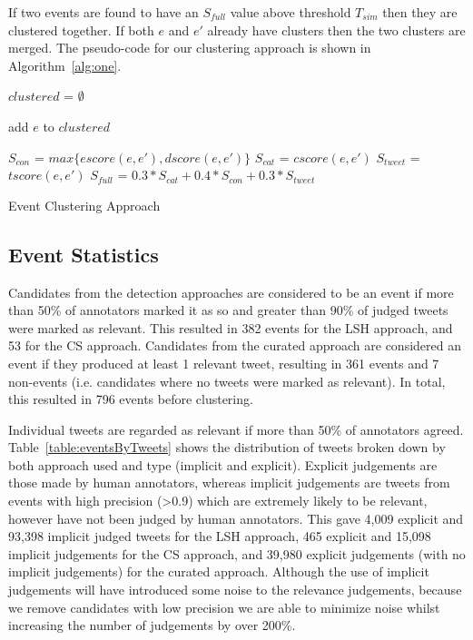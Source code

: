 If two events are found to have an \(S_{full}\) value above threshold \(T_{sim}\) then they are clustered together. If both \(e\) and \(e'\) already have clusters then the two clusters are merged.
The pseudo-code for our clustering approach is shown in Algorithm~\ref{alg:one}.

\begin{algorithm}
$clustered$ = $\emptyset$\;
 {
	add $e$ to $clustered$\;
	 {

		$S_{con}$ = $max\{escore(e, e'), dscore(e, e')\}$\;
		$S_{cat}$ = $cscore(e, e')$\;
		$S_{tweet}$ = $tscore(e, e')$\;
		$S_{full}$ = $0.3 * S_{cat} + 0.4 * S_{con} + 0.3 * S_{tweet}$\;
		 {
			 
		}
	}
}
\caption{Event Clustering Approach}
\label{alg:one}
\end{algorithm}

\subsection{Event Statistics}

Candidates from the detection approaches are considered to be an event if more than 50\% of annotators marked it as so and greater than 90\% of judged tweets were marked as relevant.
This resulted in 382 events for the LSH approach, and 53 for the CS approach.
Candidates from the curated approach are considered an event if they produced at least 1 relevant tweet, resulting in 361 events and 7 non-events (i.e. candidates where no tweets were marked as relevant).
In total, this resulted in 796 events before clustering.

Individual tweets are regarded as relevant if more than 50\% of annotators agreed.
Table~\ref{table:eventsByTweets} shows the distribution of tweets broken down by both approach used and type (implicit and explicit).
Explicit judgements are those made by human annotators, whereas implicit judgements are  tweets from events with high precision (\textgreater 0.9) which are extremely likely to be relevant, however have not been judged by human annotators.
This gave 4,009 explicit and 93,398 implicit judged tweets for the LSH approach, 465 explicit and 15,098 implicit judgements for the CS approach, and 39,980 explicit judgements (with no implicit judgements) for the curated approach.
Although the use of implicit judgements will have introduced some noise to the relevance judgements, because we remove candidates with low precision we are able to minimize noise whilst increasing the number of judgements by over 200\%.


